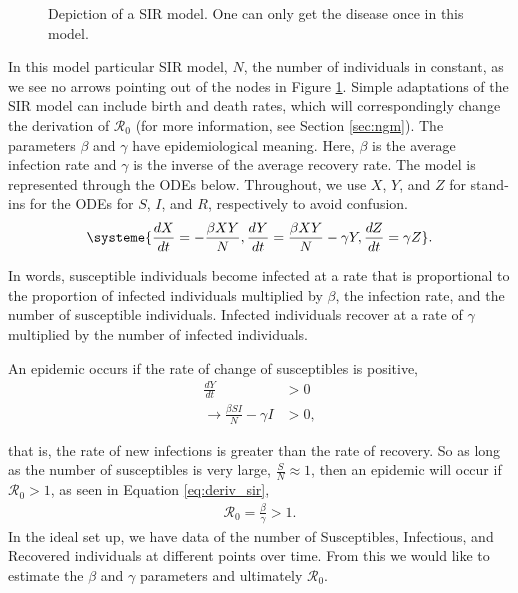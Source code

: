 \documentclass[12pt]{article}
\newcommand{\rr}{\ensuremath{\mathcal{R}_0}}
\begin{document}
\begin{figure}[h]
\centering
{}
\caption{Depiction of a SIR model.  One can only get the disease once in this model.}\label{fig::sir}
\end{figure}
In this model particular  SIR model, $N$, the number of individuals in constant, as we see no arrows pointing out of the nodes in Figure \ref{fig::sir}. Simple adaptations of the SIR model can include birth and death rates, which will correspondingly change the derivation of $\rr$ (for more information, see Section \ref{sec:ngm}). The parameters  $\beta$ and $\gamma$ have epidemiological meaning.  Here, $\beta$ is the average infection rate and $\gamma$ is the inverse of the average recovery rate.  The model is represented through the ODEs below.  Throughout, we use $X$, $Y$, and $Z$ for stand-ins for the ODEs for $S$, $I$, and $R$, respectively to avoid confusion.
\begin{align}
\systeme{\frac{dX}{dt} = -\frac{\beta XY}{N}, \frac{dY}{dt} = \frac{\beta XY}{N} - \gamma Y, \frac{dZ}{dt} = \gamma Z}. \label{eq::sir}
\end{align}

In words, susceptible individuals become infected at a rate that is proportional to the proportion of infected individuals multiplied by $\beta$, the infection rate, and the number of susceptible individuals.  Infected individuals recover at a rate of $\gamma$ multiplied by the number of infected individuals.

An epidemic occurs if the rate of change of susceptibles is positive,
\begin{align*}
  \frac{dY}{dt} &> 0 \\
\rightarrow \frac{\beta S I}{N}  - \gamma I &> 0 ,
\end{align*}

that is,  the rate of new infections is greater than the rate of recovery.  So as long as the number of susceptibles is very large, $\frac{S}{N} \approx 1$, then an epidemic will occur if $\rr >1$, as seen in Equation \ref{eq:deriv_sir},
\begin{align}\label{eq:deriv_sir}
  \rr = \frac{\beta}{\gamma} > 1.
  \end{align}
In the ideal set up, we have data of the number of Susceptibles, Infectious, and Recovered individuals at different points over time.  From this we would like to estimate the $\beta$ and $\gamma$ parameters and ultimately $\rr$.
\end{document}
